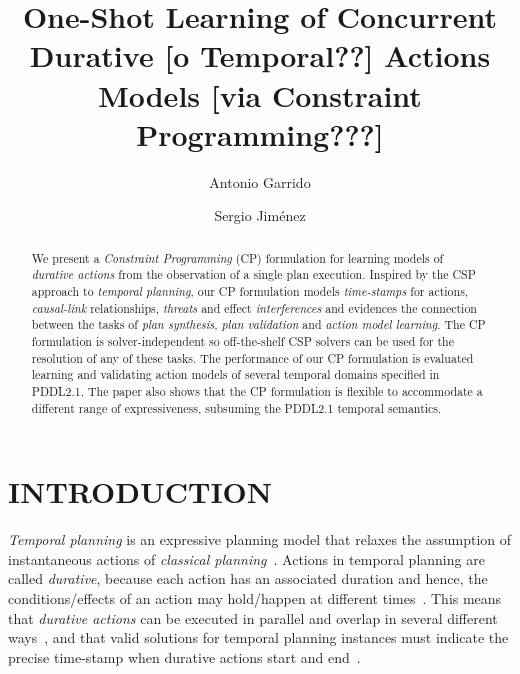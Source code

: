 \documentclass{ecai}
\begin{document}
\title{One-Shot Learning of Concurrent Durative [o Temporal??] Actions Models [via Constraint Programming???]}
\author{Antonio Garrido \and Sergio Jim\'enez}
 
 
\maketitle

\begin{abstract}
  We present a {\em Constraint Programming} (CP) formulation for learning models of {\em durative actions} from the observation of a single plan execution. Inspired by the CSP approach to {\em temporal planning}, our CP formulation models {\em time-stamps} for actions, {\em causal-link} relationships, {\em threats} and effect {\em interferences} and evidences the connection between the tasks of {\em plan synthesis}, {\em plan validation} and {\em action model learning}. The CP formulation is solver-independent so off-the-shelf CSP solvers can be used for the resolution of any of these tasks. The performance of our CP formulation is evaluated learning and validating action models of several temporal domains specified in PDDL2.1. The paper also shows that the CP formulation is flexible to accommodate a different range of expressiveness, subsuming the PDDL2.1 temporal semantics.
\end{abstract}



\section{INTRODUCTION}

{\em Temporal planning} is an expressive planning model that relaxes the assumption of instantaneous actions of {\em classical planning}~\cite{geffner2013concise}. Actions in temporal planning are called {\em durative}, because each action has an associated duration and hence, the conditions/effects of an action may hold/happen at different times~\cite{fox2003pddl2}. This means that {\em durative actions} can be executed in parallel and overlap in several different ways~\cite{cushing2007temporal}, and that valid solutions for temporal planning instances must indicate the precise time-stamp when durative actions start and end~\cite{howey2004val}.
\end{document}
